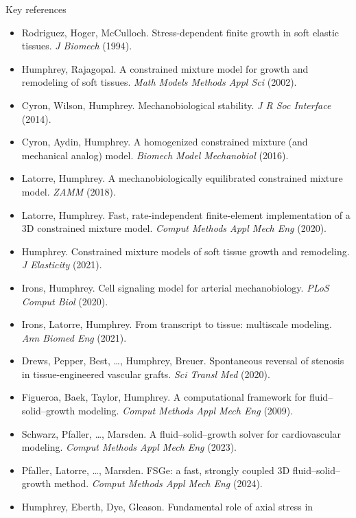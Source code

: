 \begin{frame}[t,allowframebreaks]{Key references}
  \footnotesize
  \begin{itemize}\setlength{\itemsep}{0.35em}
    \item Rodriguez, Hoger, McCulloch. Stress-dependent finite growth in soft
    elastic tissues. \textit{J Biomech} (1994).
    \item Humphrey, Rajagopal. A constrained mixture model for growth and
    remodeling of soft tissues. \textit{Math Models Methods Appl Sci} (2002).
    \item Cyron, Wilson, Humphrey. Mechanobiological stability. \textit{J R Soc
    Interface} (2014).
    \item Cyron, Aydin, Humphrey. A homogenized constrained mixture (and
    mechanical analog) model. \textit{Biomech Model Mechanobiol} (2016).
    \item Latorre, Humphrey. A mechanobiologically equilibrated constrained
    mixture model. \textit{ZAMM} (2018).
    \item Latorre, Humphrey. Fast, rate-independent finite-element implementation
    of a 3D constrained mixture model. \textit{Comput Methods Appl Mech Eng} (2020).
    \item Humphrey. Constrained mixture models of soft tissue growth and
    remodeling. \textit{J Elasticity} (2021).
    \item Irons, Humphrey. Cell signaling model for arterial mechanobiology.
    \textit{PLoS Comput Biol} (2020).
    \item Irons, Latorre, Humphrey. From transcript to tissue: multiscale
    modeling. \textit{Ann Biomed Eng} (2021).
    \item Drews, Pepper, Best, \ldots, Humphrey, Breuer. Spontaneous reversal of
    stenosis in tissue-engineered vascular grafts. \textit{Sci Transl Med} (2020).
    \item Figueroa, Baek, Taylor, Humphrey. A computational framework for
    fluid--solid--growth modeling. \textit{Comput Methods Appl Mech Eng} (2009).
    \item Schwarz, Pfaller, \ldots, Marsden. A fluid--solid--growth solver for
    cardiovascular modeling. \textit{Comput Methods Appl Mech Eng} (2023).
    \item Pfaller, Latorre, \ldots, Marsden. FSGe: a fast, strongly coupled 3D
    fluid--solid--growth method. \textit{Comput Methods Appl Mech Eng} (2024).
    \item Humphrey, Eberth, Dye, Gleason. Fundamental role of axial stress in

\end{itemize}
\end{frame}
